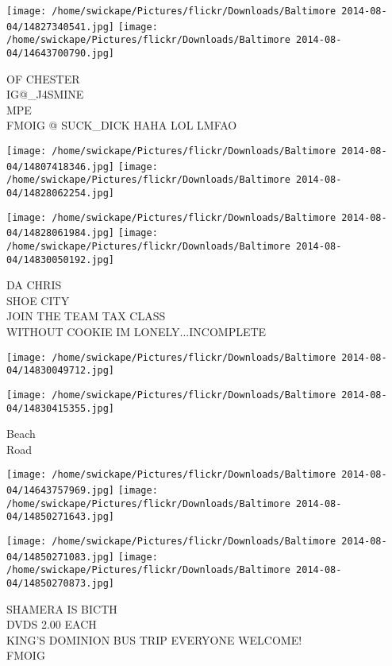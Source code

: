 \documentclass[10pt,letterpaper]{article}
\begin{document}
\texttt{[image: /home/swickape/Pictures/flickr/Downloads/Baltimore 2014-08-04/14827340541.jpg]}
\texttt{[image: /home/swickape/Pictures/flickr/Downloads/Baltimore 2014-08-04/14643700790.jpg]}

OF CHESTER\\
IG@\_J4SMINE\\
MPE\\
FMOIG @ SUCK\_DICK HAHA LOL LMFAO\\
\pagebreak

\texttt{[image: /home/swickape/Pictures/flickr/Downloads/Baltimore 2014-08-04/14807418346.jpg]}
\texttt{[image: /home/swickape/Pictures/flickr/Downloads/Baltimore 2014-08-04/14828062254.jpg]}

\texttt{[image: /home/swickape/Pictures/flickr/Downloads/Baltimore 2014-08-04/14828061984.jpg]}
\texttt{[image: /home/swickape/Pictures/flickr/Downloads/Baltimore 2014-08-04/14830050192.jpg]}

DA CHRIS\\
SHOE CITY\\
JOIN THE TEAM TAX CLASS\\
WITHOUT COOKIE IM LONELY...INCOMPLETE\\
\pagebreak

\texttt{[image: /home/swickape/Pictures/flickr/Downloads/Baltimore 2014-08-04/14830049712.jpg]}

\vspace{0.25in}
\texttt{[image: /home/swickape/Pictures/flickr/Downloads/Baltimore 2014-08-04/14830415355.jpg]}

Beach\\
Road\\
\pagebreak

\texttt{[image: /home/swickape/Pictures/flickr/Downloads/Baltimore 2014-08-04/14643757969.jpg]}
\texttt{[image: /home/swickape/Pictures/flickr/Downloads/Baltimore 2014-08-04/14850271643.jpg]}

\texttt{[image: /home/swickape/Pictures/flickr/Downloads/Baltimore 2014-08-04/14850271083.jpg]}
\texttt{[image: /home/swickape/Pictures/flickr/Downloads/Baltimore 2014-08-04/14850270873.jpg]}

SHAMERA IS BICTH\\
DVDS 2.00 EACH\\
KING'S DOMINION BUS TRIP EVERYONE WELCOME!\\
FMOIG\\
\pagebreak
\end{document}
